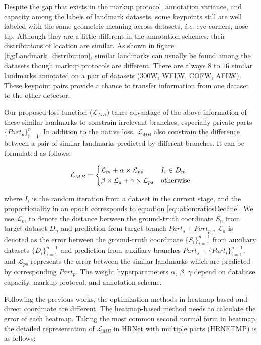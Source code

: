 \documentclass[journal,transmag]{IEEEtran}
\begin{document}
Despite the gap that exists in the markup protocol, annotation variance, and capacity among the labels of landmark datasets, 
some keypoints still are well labeled with the same geometric meaning across datasets, \emph{i.e.} eye corners, nose tip.
Although they are a little different in the annotation schemes, their distributions of location are similar.
As shown in figure \ref{fig:Landmark_distribution}, similar landmarks can usually be found among the datasets though markup protocols are different.
There are always 8 to 16 similar landmarks annotated on a pair of datasets (300W\cite{300W}, WFLW\cite{LABWFLW}, COFW\cite{COFW}, AFLW\cite{AFLW}).
These keypoint pairs provide a chance to transfer information from one dataset to the other detector.

Our proposed loss function ($\mathcal{L}_{MB}$) takes advantage of the above information of these similar landmarks to constrain irrelevant branches, especially private parts $\{Part_p\}_{i=1}^{n}$. 
In addition to the native loss, $\mathcal{L}_{MB}$ also constrain the difference between a pair of similar landmarks predicted by different branches.
It can be formulated as follows:

\begin{equation}
   \label{eq:MBL}
   \mathcal{L}_{MB} =
   \begin{cases}
      \mathcal{L}_{m} + \alpha \times \mathcal{L}_{ps} & \text{$ I_i \in D_{m}$} \\
      \beta \times \mathcal{L}_{a} + \gamma \times \mathcal{L}_{ps} & \text{otherwise}
   \end{cases}
\end{equation}


where $I_i$ is the random iteration from a dataset in the current stage, and the proportionality in an epoch corresponds to equation \ref{equation:ratiosDecline}.
We use $\mathcal{L}_m$  to denote the distance between the ground-truth coordinate $S_n$ from target dataset $D_n$ and prediction from target branch  $Part_s + Part_{p_n}$,
$\mathcal{L}_a$ is denoted as the error between the ground-truth coordinate $\{S_i\}_{i=1}^{n-1}$ from auxiliary datasets $\{D_i\}_{i=1}^{n-1}$ and prediction from auxiliary branches $Part_s + \{Part_i\}_{i=1}^{n-1}$, 
and $\mathcal{L}_{ps}$ represents the error between the similar landmarks which are predicted by corresponding $Part_p$.
The weight hyperparameters $\alpha$, $\beta$, $\gamma$ depend on database capacity, markup protocol, and annotation scheme.

Following the previous works\cite{feng2018wing,HRNET,guo2019pfld}, the optimization methods in heatmap-based and direct coordinate are different.
The heatmap-based method needs to calculate the error of each heatmap.
Taking the most common second normal form in heatmap\cite{kowalski2017deep,HRNET}, the detailed representation of $\mathcal{L}_{MB}$ in HRNet with multiple parts (HRNETMP) is as follows:
\end{document}
